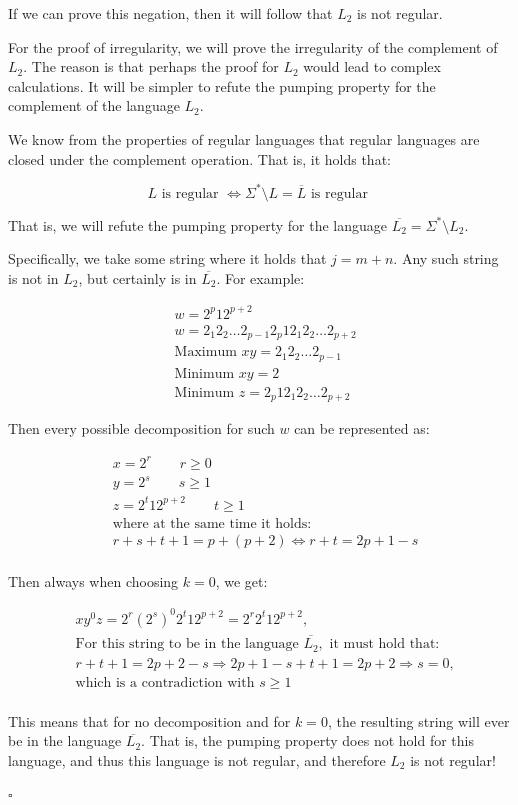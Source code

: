 \documentclass[10pt]{article}
\begin{document}
If we can prove this negation, then it will follow that $L_2$ is not regular.

For the proof of irregularity, we will prove the irregularity of the complement of $L_2$. The reason is that perhaps the proof for $L_2$ would lead to complex calculations. It will be simpler to refute the pumping property for the complement of the language $L_2$. 

We know from the properties of regular languages that regular languages are closed under the complement operation. That is, it holds that:

$$ L \text{ is regular } \Leftrightarrow \Sigma^{*} \setminus L = \overline{L} \text{ is regular }$$

That is, we will refute the pumping property for the language $\overline{L_2} = \Sigma^{*} \setminus L_2$.

Specifically, we take some string where it holds that $j = m + n$. Any such string is not in $L_2$, but certainly is in $\overline{L_2}$. For example:

\begin{align*}
& w = 2^{p}12^{p+2} \\
& w = 2_{1}2_{2}\dots2_{p-1}2_{p}12_{1}2_{2}\dots2_{p+2} \\
& \text{Maximum } xy = 2_{1}2_{2}\dots2_{p-1} \\
& \text{Minimum } xy = 2 \\
& \text{Minimum } z = 2_{p}12_{1}2_{2}\dots2_{p+2}
\end{align*}

Then every possible decomposition for such $w$ can be represented as:

\begin{align*}
& x = 2^r \qquad r \geq 0 \\
& y = 2^s \qquad s \geq 1 \\
& z = 2^{t}12^{p+2} \qquad t \geq 1 \\
& \text{where at the same time it holds:} \\
& r + s + t + 1 = p + (p + 2) \Leftrightarrow r + t = 2p + 1 - s \\
\end{align*}

Then always when choosing $k=0$, we get:

\begin{align*}
& xy^{0}z = 2^{r}(2^{s})^{0}2^{t}12^{p+2} = 2^{r}2^{t}12^{p+2}, \\
& \text{For this string to be in the language } \overline{L_2}, \text{ it must hold that:} \\
& r + t + 1 = 2p + 2 - s \Rightarrow 2p + 1 - s + t + 1 = 2p + 2 \Rightarrow s = 0, \\
& \text{which is a contradiction with } s \geq 1 \\
\end{align*}

This means that for no decomposition and for $k = 0$, the resulting string will ever be in the language $\overline{L_2}$. That is, the pumping property does not hold for this language, and thus this language is not regular, and therefore $L_2$ is not regular!

\hfill $\square$
\end{document}
